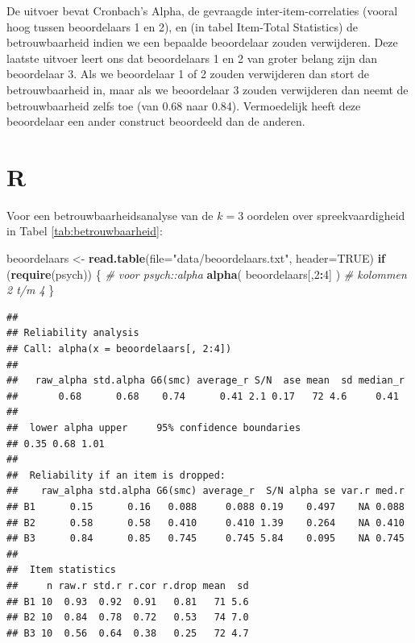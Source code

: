 \documentclass[
]{book}
\newenvironment{Shaded}{\begin{snugshade}}{\end{snugshade}}
\newcommand{\CommentTok}[1]{\textcolor[rgb]{0.56,0.35,0.01}{\textit{#1}}}
\newcommand{\ControlFlowTok}[1]{\textcolor[rgb]{0.13,0.29,0.53}{\textbf{#1}}}
\newcommand{\DataTypeTok}[1]{\textcolor[rgb]{0.13,0.29,0.53}{#1}}
\newcommand{\DecValTok}[1]{\textcolor[rgb]{0.00,0.00,0.81}{#1}}
\newcommand{\KeywordTok}[1]{\textcolor[rgb]{0.13,0.29,0.53}{\textbf{#1}}}
\newcommand{\NormalTok}[1]{#1}
\newcommand{\OperatorTok}[1]{\textcolor[rgb]{0.81,0.36,0.00}{\textbf{#1}}}
\newcommand{\OtherTok}[1]{\textcolor[rgb]{0.56,0.35,0.01}{#1}}
\newcommand{\StringTok}[1]{\textcolor[rgb]{0.31,0.60,0.02}{#1}}
\begin{document}
De uitvoer bevat Cronbach's Alpha, de gevraagde
inter-item-correlaties (vooral hoog tussen beoordelaars 1 en 2), en (in
tabel Item-Total Statistics) de betrouwbaarheid indien we een bepaalde
beoordelaar zouden verwijderen. Deze laatste uitvoer leert ons dat
beoordelaars 1 en 2 van groter belang zijn dan beoordelaar 3. Als we
beoordelaar 1 of 2 zouden verwijderen dan stort de betrouwbaarheid in,
maar als we beoordelaar 3 zouden verwijderen dan neemt de
betrouwbaarheid zelfs toe (van 0.68 naar 0.84). Vermoedelijk heeft deze
beoordelaar een ander construct beoordeeld dan de anderen.

\hypertarget{r-10}{%
\section{R}\label{r-10}}

Voor een betrouwbaarheidsanalyse van de \(k=3\) oordelen over
spreekvaardigheid in Tabel \ref{tab:betrouwbaarheid}:\\

\begin{Shaded}
\begin{Highlighting}[]
\NormalTok{beoordelaars \textless{}{-}}\StringTok{ }\KeywordTok{read.table}\NormalTok{(}\DataTypeTok{file=}\StringTok{"data/beoordelaars.txt"}\NormalTok{, }\DataTypeTok{header=}\OtherTok{TRUE}\NormalTok{)}
\ControlFlowTok{if}\NormalTok{ (}\KeywordTok{require}\NormalTok{(psych)) \{ }\CommentTok{\# voor psych::alpha}
  \KeywordTok{alpha}\NormalTok{( beoordelaars[,}\DecValTok{2}\OperatorTok{:}\DecValTok{4}\NormalTok{] ) }\CommentTok{\# kolommen 2 t/m 4}
\NormalTok{\}}
\end{Highlighting}
\end{Shaded}

\begin{verbatim}
## 
## Reliability analysis   
## Call: alpha(x = beoordelaars[, 2:4])
## 
##   raw_alpha std.alpha G6(smc) average_r S/N  ase mean  sd median_r
##       0.68      0.68    0.74      0.41 2.1 0.17   72 4.6     0.41
## 
##  lower alpha upper     95% confidence boundaries
## 0.35 0.68 1.01 
## 
##  Reliability if an item is dropped:
##    raw_alpha std.alpha G6(smc) average_r  S/N alpha se var.r med.r
## B1      0.15      0.16   0.088     0.088 0.19    0.497    NA 0.088
## B2      0.58      0.58   0.410     0.410 1.39    0.264    NA 0.410
## B3      0.84      0.85   0.745     0.745 5.84    0.095    NA 0.745
## 
##  Item statistics 
##     n raw.r std.r r.cor r.drop mean  sd
## B1 10  0.93  0.92  0.91   0.81   71 5.6
## B2 10  0.84  0.78  0.72   0.53   74 7.0
## B3 10  0.56  0.64  0.38   0.25   72 4.7
\end{verbatim}
\end{document}
